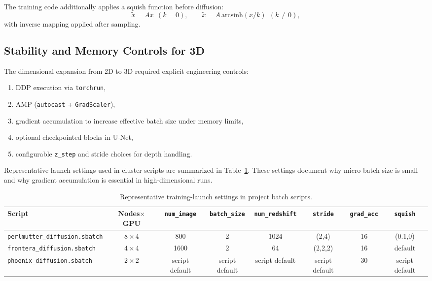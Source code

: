 \documentclass{aastex631}
\begin{document}
The training code additionally applies a squish function before diffusion:
\begin{equation}
\tilde{x}=A x \ \ (k=0),\qquad \tilde{x}=A\,\mathrm{arcsinh}(x/k) \ \ (k\neq 0),
\end{equation}
with inverse mapping applied after sampling.

\subsection{Stability and Memory Controls for 3D}
The dimensional expansion from 2D to 3D required explicit engineering controls:
\begin{enumerate}
    \item DDP execution via \texttt{torchrun},
    \item AMP (\texttt{autocast} + \texttt{GradScaler}),
    \item gradient accumulation to increase effective batch size under memory limits,
    \item optional checkpointed blocks in U-Net,
    \item configurable \texttt{z\_step} and stride choices for depth handling.
\end{enumerate}

Representative launch settings used in cluster scripts are summarized in Table~\ref{tab:hpc_settings}. These settings document why micro-batch size is small and why gradient accumulation is essential in high-dimensional runs.

\begin{table}[t]
\centering
\caption{Representative training-launch settings in project batch scripts.}
\label{tab:hpc_settings}
\begin{tabular}{lccccccc}
\toprule
Script & Nodes$\times$GPU & \texttt{num\_image} & \texttt{batch\_size} & \texttt{num\_redshift} & \texttt{stride} & \texttt{grad\_acc} & \texttt{squish} \\
\midrule
\texttt{perlmutter\_diffusion.sbatch} & $8\times4$ & 800 & 2 & 1024 & (2,4) & 16 & (0.1,0) \\
\texttt{frontera\_diffusion.sbatch} & $4\times4$ & 1600 & 2 & 64 & (2,2,2) & 16 & default \\
\texttt{phoenix\_diffusion.sbatch} & $2\times2$ & script default & script default & script default & script default & 30 & script default \\
\bottomrule
\end{tabular}
\end{table}
\end{document}
